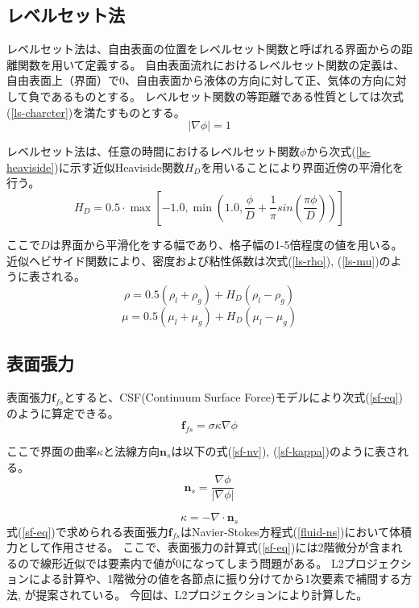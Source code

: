 \subsection{レベルセット法}
レベルセット法は、自由表面の位置をレベルセット関数と呼ばれる界面からの距離関数を用いて定義する。
自由表面流れにおけるレベルセット関数の定義は、自由表面上（界面）で0、自由表面から液体の方向に対して正、気体の方向に対して負であるものとする。
レベルセット関数の等距離である性質としては次式(\ref{ls-charcter})を満たすものとする。
\begin{equation}
\label{ls-charcter}
	| \nabla \phi | = 1
\end{equation}

レベルセット法は、任意の時間におけるレベルセット関数$\phi$から次式(\ref{ls-heaviside})に示す近似Heaviside関数$H_{D}$を用いることにより界面近傍の平滑化を行う。
\begin{equation}
\label{ls-heaviside}
	H_{D} = 0.5 \cdot \max \left[-1.0, \min \left(1.0, \frac{\phi}{D} + \frac{1}{\pi} sin\left(\frac{\pi \phi}{D}\right)\right) \right]
\end{equation}

ここで$D$は界面から平滑化をする幅であり、格子幅の1-5倍程度の値を用いる。
近似ヘビサイド関数により、密度および粘性係数は次式(\ref{ls-rho}), (\ref{ls-mu})のように表される。
\begin{equation}
\label{ls-rho}
	\rho = 0.5 (\rho_l + \rho_g) + H_{D} (\rho_l - \rho_g)
\end{equation}
\begin{equation}
\label{ls-mu}
	\mu = 0.5 (\mu_l + \mu_g) + H_{D} (\mu_l - \mu_g)
\end{equation}


\subsection{表面張力}
表面張力$\bm{f}_{fs}$とすると、CSF(Continuum Surface Force)モデルにより次式(\ref{sf-eq})のように算定できる。
\begin{equation}
\label{sf-eq}
	\bm{f}_{fs} = \sigma \kappa \nabla \phi
\end{equation}

ここで界面の曲率$\kappa$と法線方向$\bm{n}_{s}$は以下の式(\ref{sf-nv}), (\ref{sf-kappa})のように表される。
\begin{equation}
\label{sf-nv}
	\bm{n}_{s} = \frac{\nabla \phi}{| \nabla \phi |}
\end{equation}

\begin{equation}
\label{sf-kappa}
	\kappa = - \nabla \cdot \bm{n}_{s}
\end{equation}
式(\ref{sf-eq})で求められる表面張力$\bm{f}_{fs}$はNavier-Stokes方程式(\ref{fluid-ns})において体積力として作用させる。
ここで、表面張力の計算式(\ref{sf-eq})には2階微分が含まれるので線形近似では要素内で値が0になってしまう問題がある。
L2プロジェクションによる計算\cite{Nagrath2003}や、1階微分の値を各節点に振り分けてから1次要素で補間する方法\cite{Matsumoto2006}, \cite{Shi2019}が提案されている。
今回は、L2プロジェクションにより計算した。

